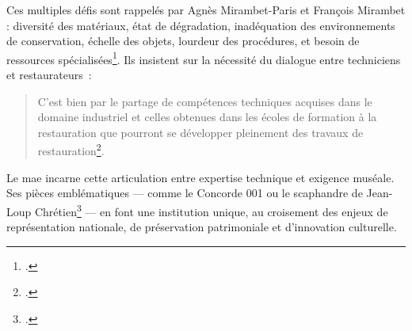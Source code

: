 Ces multiples défis sont rappelés par Agnès Mirambet-Paris et François Mirambet : diversité des matériaux, état de dégradation, inadéquation des environnements de conservation, échelle des objets, lourdeur des procédures, et besoin de ressources spécialisées\footcite{mirambet-parisConservationrestaurationPatrimoineTechnique2011}. Ils insistent sur la nécessité du dialogue entre techniciens et restaurateurs :
\begin{quote}
	\og C’est bien par le partage de compétences techniques acquises dans le domaine industriel et celles obtenues dans les écoles de formation à la restauration que pourront se développer pleinement des travaux de restauration\footcite{mirambet-parisConservationrestaurationPatrimoineTechnique2011}.\fg
\end{quote}

Le \ac{mae} incarne cette articulation entre expertise technique et exigence muséale. Ses pièces emblématiques — comme le Concorde 001 ou le scaphandre de Jean-Loup Chrétien\footcite{champenoisTresorsMuseeLair} — en font une institution unique, au croisement des enjeux de représentation nationale, de préservation patrimoniale et d’innovation culturelle.
